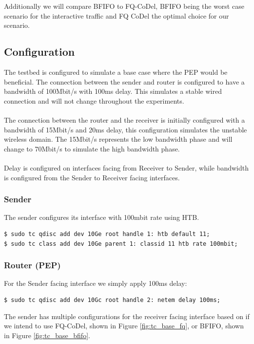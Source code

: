 \documentclass[a4paper,english, 12pt]{report}
\begin{document}
Additionally we will compare BFIFO to FQ-CoDel, BFIFO being the worst case scenario for the interactive traffic and FQ CoDel the optimal choice for our scenario.

\subsection{Configuration}
The testbed is configured to simulate a base case where the PEP would be beneficial.
The connection between the sender and router is configured to have a bandwidth of 100Mbit/s with 100ms delay. This simulates a stable wired connection and will not change throughout the experiments.\\\\
The connection between the router and the receiver is initially configured with a bandwidth of 15Mbit/s and 20ms delay, this configuration simulates the unstable wireless domain. The 15Mbit/s represents the low bandwidth phase and will change to 70Mbit/s to simulate the high bandwidth phase.\\\\
Delay is configured on interfaces facing from Receiver to Sender, while bandwidth is configured from the Sender to Receiver facing interfaces. 

\subsubsection{Sender}
The sender configures its interface with 100mbit rate using HTB.
\begin{verbatim}
$ sudo tc qdisc add dev 10Ge root handle 1: htb default 11;
$ sudo tc class add dev 10Ge parent 1: classid 11 htb rate 100mbit;
\end{verbatim}

\subsubsection{Router (PEP)}
For the Sender facing interface we simply apply 100ms delay:
\begin{verbatim}
$ sudo tc qdisc add dev 10Gc root handle 2: netem delay 100ms;
\end{verbatim}

The sender has multiple configurations for the receiver facing interface based on if we intend to use FQ-CoDel, shown in Figure \ref{fig:tc_base_fq}, or BFIFO, shown in Figure \ref{fig:tc_base_bfifo}.\\
\end{document}

